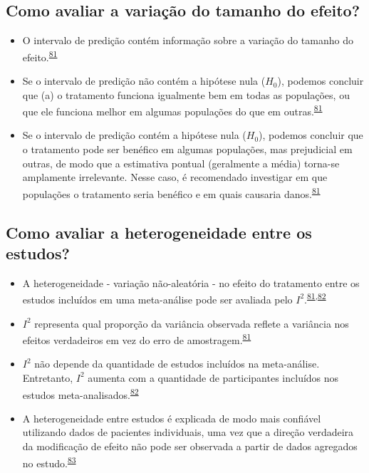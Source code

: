 \documentclass[
]{book}
\begin{document}
\hypertarget{como-avaliar-a-variauxe7uxe3o-do-tamanho-do-efeito}{%
\subsection{Como avaliar a variação do tamanho do efeito?}\label{como-avaliar-a-variauxe7uxe3o-do-tamanho-do-efeito}}

\begin{itemize}
\item
  O intervalo de predição contém informação sobre a variação do tamanho do efeito.\textsuperscript{\protect\hyperlink{ref-Borenstein2022}{81}}
\item
  Se o intervalo de predição não contém a hipótese nula (\(H_{0}\)), podemos concluir que (a) o tratamento funciona igualmente bem em todas as populações, ou que ele funciona melhor em algumas populações do que em outras.\textsuperscript{\protect\hyperlink{ref-Borenstein2022}{81}}
\item
  Se o intervalo de predição contém a hipótese nula (\(H_{0}\)), podemos concluir que o tratamento pode ser benéfico em algumas populações, mas prejudicial em outras, de modo que a estimativa pontual (geralmente a média) torna-se amplamente irrelevante. Nesse caso, é recomendado investigar em que populações o tratamento seria benéfico e em quais causaria danos.\textsuperscript{\protect\hyperlink{ref-Borenstein2022}{81}}
\end{itemize}

\hypertarget{como-avaliar-a-heterogeneidade-entre-os-estudos}{%
\subsection{Como avaliar a heterogeneidade entre os estudos?}\label{como-avaliar-a-heterogeneidade-entre-os-estudos}}

\begin{itemize}
\item
  A heterogeneidade - variação não-aleatória - no efeito do tratamento entre os estudos incluídos em uma meta-análise pode ser avaliada pelo \(I^{2}\).\textsuperscript{\protect\hyperlink{ref-Borenstein2022}{81},\protect\hyperlink{ref-Ruxfccker2008}{82}}
\item
  \(I^{2}\) representa qual proporção da variância observada reflete a variância nos efeitos verdadeiros em vez do erro de amostragem.\textsuperscript{\protect\hyperlink{ref-Borenstein2022}{81}}
\item
  \(I^{2}\) não depende da quantidade de estudos incluídos na meta-análise. Entretanto, \(I^{2}\) aumenta com a quantidade de participantes incluídos nos estudos meta-analisados.\textsuperscript{\protect\hyperlink{ref-Ruxfccker2008}{82}}
\item
  A heterogeneidade entre estudos é explicada de modo mais confiável utilizando dados de pacientes individuais, uma vez que a direção verdadeira da modificação de efeito não pode ser observada a partir de dados agregados no estudo.\textsuperscript{\protect\hyperlink{ref-degrooth2023}{83}}
\end{itemize}
\end{document}
